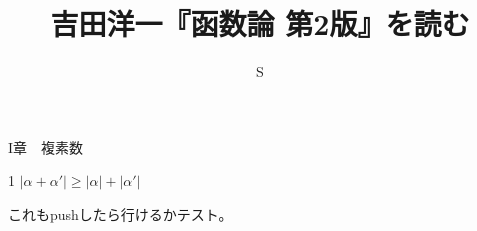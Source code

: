 \documentclass{article}
\title{吉田洋一『函数論 第2版』を読む}
\author{S}
\begin{document}
\maketitle
I章　複素数

1 $|\alpha+\alpha'|\ge|\alpha|+|\alpha'|$

これもpushしたら行けるかテスト。
\end{document}
